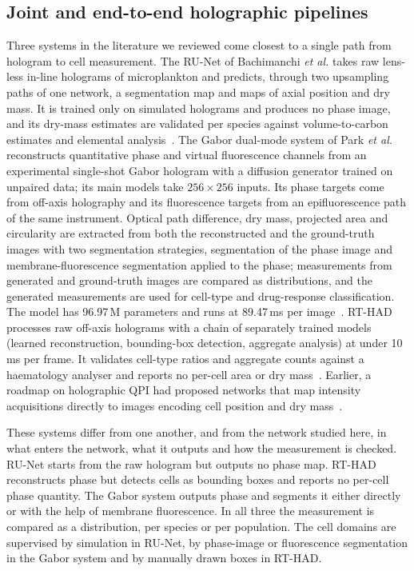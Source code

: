 \documentclass[11pt]{article}
\begin{document}
\subsection{Joint and end-to-end holographic pipelines}
\label{sec:rw-joint}

Three systems in the literature we reviewed come closest to a single path from
hologram to cell measurement. The RU-Net of Bachimanchi \emph{et al.} takes raw
lens-less in-line holograms of microplankton and predicts, through two
upsampling paths of one network, a segmentation map and maps of axial position
and dry mass. It is trained only on simulated holograms and produces no phase
image, and its dry-mass estimates are validated per species against
volume-to-carbon estimates and elemental
analysis~\cite{bachimanchi2022microplankton}. The Gabor dual-mode system of
Park \emph{et al.} reconstructs quantitative phase and virtual fluorescence
channels from an experimental single-shot Gabor hologram with a diffusion
generator trained on unpaired data; its main models take $256\times256$ inputs.
Its phase targets come from off-axis holography and its fluorescence targets
from an epifluorescence path of the same instrument. Optical path difference,
dry mass, projected area and circularity are extracted from both the
reconstructed and the ground-truth images with two segmentation strategies,
segmentation of the phase image and membrane-fluorescence segmentation applied
to the phase; measurements from generated and ground-truth images are compared
as distributions, and the generated measurements are used for cell-type and
drug-response classification. The model has 96.97\,M parameters and runs at
89.47\,ms per image~\cite{park2026ai}.
RT-HAD processes raw off-axis holograms with a chain of separately trained
models (learned reconstruction, bounding-box detection, aggregate analysis) at
under 10\,ms per frame. It validates cell-type ratios and aggregate counts
against a haematology analyser and reports no per-cell area or dry
mass~\cite{delikoyun2025rthad}. Earlier, a roadmap on holographic QPI had
proposed networks that map intensity acquisitions directly to images encoding
cell position and dry mass~\cite{balasubramani2021roadmap}.

These systems differ from one another, and from the network studied here, in
what enters the network, what it outputs and how the measurement is checked.
RU-Net starts from the raw hologram but outputs no phase map. RT-HAD
reconstructs phase but detects cells as bounding boxes and reports no per-cell
phase quantity. The Gabor system outputs phase and segments it either directly
or with the help of membrane fluorescence. In all three the measurement is
compared as a distribution, per species or per population. The cell domains
are supervised by simulation in RU-Net, by phase-image or fluorescence
segmentation in the Gabor system and by manually drawn boxes in RT-HAD.
\end{document}
